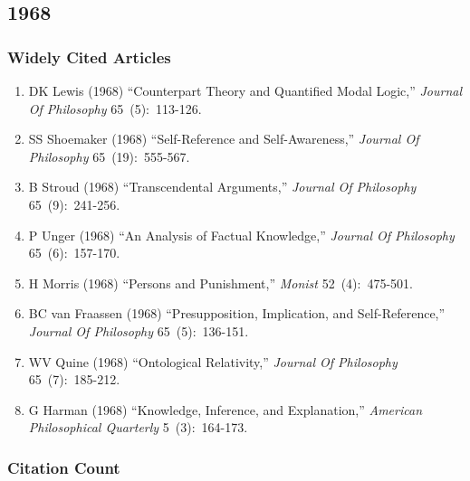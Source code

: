 \documentclass[
  10pt,
  letterpaper,
  DIV=11,
  numbers=noendperiod,
  twoside]{scrartcl}
\providecommand{\tightlist}{%
  \setlength{\itemsep}{0pt}\setlength{\parskip}{0pt}}\usepackage{longtable,booktabs,array}
\begin{document}
\newpage

\subsection{1968}\label{sec-s1968}

\subsubsection*{Widely Cited Articles}\label{widely-cited-articles-12}

\begin{enumerate}
\def\labelenumi{\arabic{enumi}.}
\tightlist
\item
  DK Lewis (1968) ``Counterpart Theory and Quantified Modal Logic,''
  \emph{Journal Of Philosophy} 65~(5):~113-126.
\item
  SS Shoemaker (1968) ``Self-Reference and Self-Awareness,''
  \emph{Journal Of Philosophy} 65~(19):~555-567.
\item
  B Stroud (1968) ``Transcendental Arguments,'' \emph{Journal Of
  Philosophy} 65~(9):~241-256.
\item
  P Unger (1968) ``An Analysis of Factual Knowledge,'' \emph{Journal Of
  Philosophy} 65~(6):~157-170.
\item
  H Morris (1968) ``Persons and Punishment,'' \emph{Monist}
  52~(4):~475-501.
\item
  BC van Fraassen (1968) ``Presupposition, Implication, and
  Self-Reference,'' \emph{Journal Of Philosophy} 65~(5):~136-151.
\item
  WV Quine (1968) ``Ontological Relativity,'' \emph{Journal Of
  Philosophy} 65~(7):~185-212.
\item
  G Harman (1968) ``Knowledge, Inference, and Explanation,''
  \emph{American Philosophical Quarterly} 5~(3):~164-173.
\end{enumerate}

\subsubsection*{Citation Count}\label{sec-count-1968}
\end{document}
